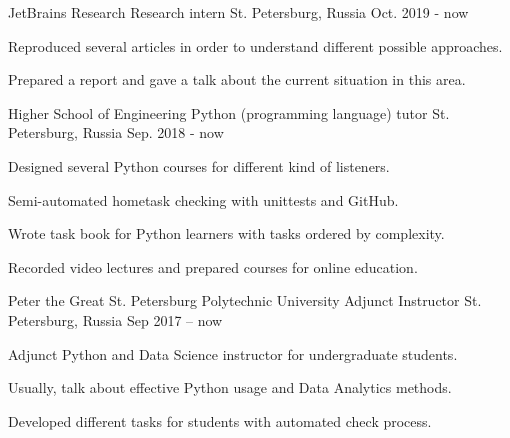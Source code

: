 

\begin{cventries}
	
  \cventry
	{JetBrains Research} %
	{Research intern} %
	{St. Petersburg, Russia} %
	{Oct. 2019 - now} %
	{
		\begin{cvitems} %
			\item {Reproduced several articles in order to understand different possible approaches.}
			\item {Prepared a report and gave a talk about the current situation in this area.}
		\end{cvitems}
}

  \cventry
    {Higher School of Engineering} %
    {Python (programming language) tutor} %
    {St. Petersburg, Russia} %
    {Sep. 2018 - now} %
    {
		\begin{cvitems} %
		 \item {Designed several Python courses for different kind of listeners.}
		 \item {Semi-automated hometask checking with unittests and GitHub.}
		 \item {Wrote task book for Python learners with tasks ordered by complexity.}
		 \item {Recorded video lectures and prepared courses for online education.}
		\end{cvitems}
    }

  \cventry
	{Peter the Great St. Petersburg Polytechnic University} %
	{Adjunct Instructor} %
	{St. Petersburg, Russia} %
	{Sep 2017 -- now} %
	{
		\begin{cvitems} %
			\item {Adjunct Python and Data Science instructor for undergraduate students.}
			\item {Usually, talk about effective Python usage and Data Analytics methods.}
			\item {Developed different tasks for students with automated check process.}
		\end{cvitems}
	}


\end{cventries}
